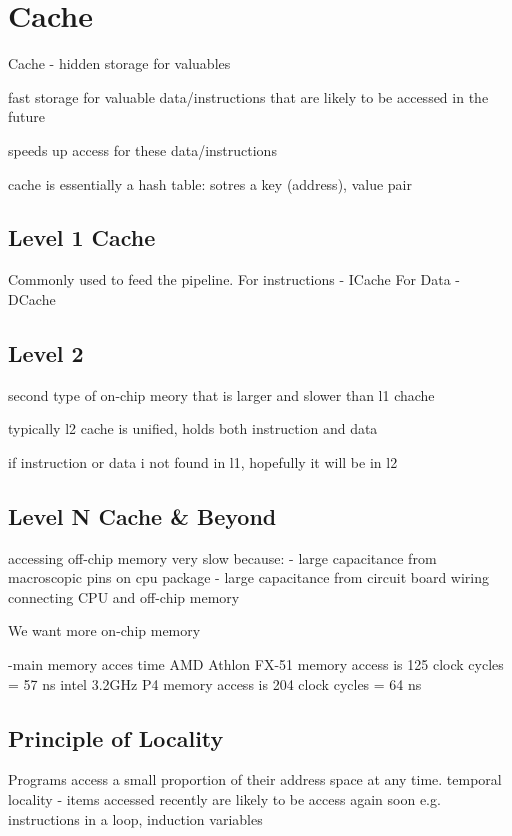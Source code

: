 \section{Cache}

Cache - hidden storage for valuables

fast storage for valuable data/instructions that are likely to be accessed
in the future

speeds up access for these data/instructions

cache is essentially a hash table: sotres a key (address), value pair

\subsection{Level 1 Cache}
Commonly used to feed the pipeline.
For instructions - ICache
For Data - DCache


\subsection{Level 2}
second type of on-chip meory that is larger and slower than l1 chache

typically l2 cache is unified, holds both instruction and data

if instruction or data i not found in l1, hopefully it will be in l2


\subsection{Level N Cache \& Beyond}
accessing off-chip memory very slow because:
- large capacitance from macroscopic pins on cpu package
- large capacitance from circuit board wiring connecting CPU and off-chip memory

We want more on-chip memory


-main memory acces time
AMD Athlon FX-51 memory access is 125 clock cycles = 57 ns
intel 3.2GHz P4 memory access is 204 clock cycles = 64 ns

\subsection{Principle of Locality}
Programs access a small proportion of their address space at any time.
temporal locality
- items accessed recently are likely to be access again soon
e.g. instructions in a loop, induction variables

